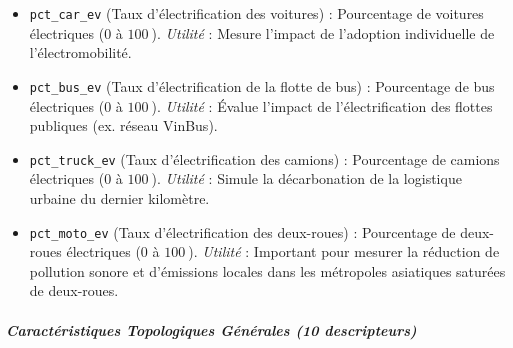 \documentclass[10pt, a4paper]{article}
\providecommand{\tightlist}{}
\begin{document}
\begin{itemize}
\tightlist
\item
  \texttt{pct\_car\_ev} (Taux d'électrification des voitures) :
  Pourcentage de voitures électriques (\(0\) à \(100\ %
  \)). \emph{Utilité} : Mesure l'impact de l'adoption individuelle de
  l'électromobilité.
\item
  \texttt{pct\_bus\_ev} (Taux d'électrification de la flotte de bus) :
  Pourcentage de bus électriques (\(0\) à \(100\ %
  \)). \emph{Utilité} : Évalue l'impact de l'électrification des flottes
  publiques (ex. réseau VinBus).
\item
  \texttt{pct\_truck\_ev} (Taux d'électrification des camions) :
  Pourcentage de camions électriques (\(0\) à \(100\ %
  \)). \emph{Utilité} : Simule la décarbonation de la logistique urbaine
  du dernier kilomètre.
\item
  \texttt{pct\_moto\_ev} (Taux d'électrification des deux-roues) :
  Pourcentage de deux-roues électriques (\(0\) à \(100\ %
  \)). \emph{Utilité} : Important pour mesurer la réduction de pollution
  sonore et d'émissions locales dans les métropoles asiatiques saturées
  de deux-roues.
\end{itemize}

\subparagraph{Caractéristiques Topologiques Générales (10
descripteurs)}\label{caractuxe9ristiques-topologiques-guxe9nuxe9rales-10-descripteurs-1}
\end{document}

